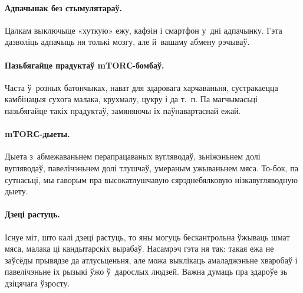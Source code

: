 \paragraph{Адпачынак без стымулятараў.}
Цалкам выключыце «хуткую» ежу, кафэін і смартфон у~дні адпачынку. Гэта дазволіць адпачыць ня толькі мозгу, але й~вашаму абмену рэчываў.

\paragraph{Пазьбягайце прадуктаў mTORС-бомбаў.}
Часта ў~розных батончыках, нават для здаровага харчаваньня, сустракаецца камбінацыя сухога малака, крухмалу, цукру і да т.~п. Па магчымасьці пазьбягайце такіх прадуктаў, замяняючы іх паўнавартаснай ежай.

\paragraph{mTORС-дыеты.}
Дыета з~абмежаваньнем перапрацаваных вугляводаў, зьніжэньнем долі вугляводаў, павелічэньнем долі тлушчаў, умераным ужываньнем мяса. То-бок, па сутнасьці, мы гаворым пра высокатлушчавую сярэднебялковую нізкавугляводную дыету.

\paragraph{Дзеці растуць.}
Існуе міт, што калі дзеці растуць, то яны могуць бескантрольна ўжываць шмат мяса, малака ці кандытарскіх вырабаў. Насамрэч гэта ня так: такая ежа не заўсёды прывядзе да атлусьценьня, але можа выклікаць амаладжэньне хваробаў і павелічэньне іх рызыкі ўжо ў~дарослых людзей. Важна думаць пра здароўе зь дзіцячага ўзросту.
